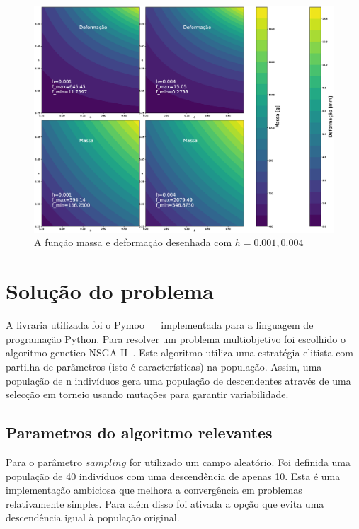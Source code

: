 \documentclass[a4paper,12pt]{article}
\begin{document}
\begin{figure}[h]
\begin{center}
\includegraphics[scale=0.3]{deformacaoEmassa.eps}
\end{center}
\caption{A função massa e deformação desenhada com $h= 0.001, 0.004$}
\label{fig:defIm1}
\end{figure}

\section{Solução do problema}

A livraria utilizada foi o Pymoo~\cite{Pymoo} ~\cite{PymooArt} implementada para a linguagem de programação Python. Para resolver um problema multiobjetivo foi escolhido o algoritmo genetico NSGA-II~\cite{NSGA}. Este algoritmo utiliza uma estratégia elitista com partilha de parâmetros (isto é características) na população. Assim, uma população de n indivíduos gera uma população de descendentes através de uma selecção em torneio usando mutações para garantir variabilidade.

\subsection{Parametros do algoritmo relevantes}

Para o parâmetro $sampling$ for utilizado um campo aleatório. Foi definida uma população de 40 indivíduos com uma descendência de apenas 10. Esta é uma implementação ambiciosa que melhora a convergência em problemas relativamente simples. Para além disso foi ativada a opção que evita uma descendência igual à população original.
\end{document}

